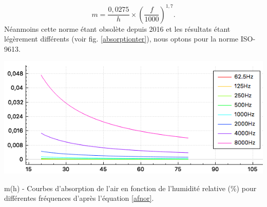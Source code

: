 \begin{equation} \label{afnor}
	m = \frac{0,0275}{h} \times (\frac{f}{1000})^{1,7}.
\end{equation}
Néanmoins cette norme étant obsolète depuis 2016 et les résultats étant légèrement différents (voir fig. \ref{absorptionter}), nous optons pour la norme ISO-9613. \\
%
\begin{figureth}
	\includegraphics[width=0.8\linewidth]{images/absorptionter}
	\caption{m(h) - Courbes d'absorption de l'air en fonction de l'humidité relative (\%) pour différentes fréquences d'après l'équation \ref{afnor}.}
	\label{absorptionter}
\end{figureth}

